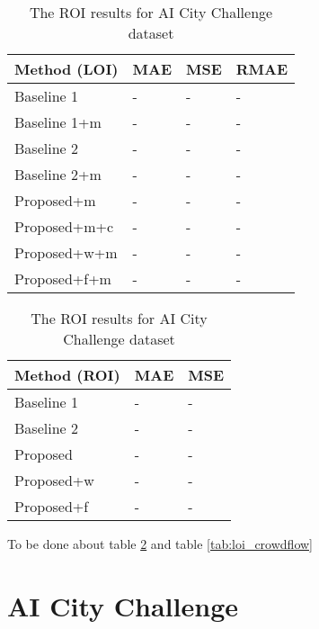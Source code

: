 \begin{table}[!htb]
	\begin{minipage}{.5\linewidth}
      \centering
		\begin{tabular}{llll}
		\hline
		Method (LOI)                               & MAE & MSE & RMAE \\ \hline
		\multicolumn{1}{l|}{Baseline 1}          & - & - & - \\
		\multicolumn{1}{l|}{Baseline 1+m}          & - & - & - \\
		\multicolumn{1}{l|}{Baseline 2}          & - & - & - \\
		\multicolumn{1}{l|}{Baseline 2+m}      & - & - & - \\
		\multicolumn{1}{l|}{Proposed+m}        	 & - & - & - \\
		\multicolumn{1}{l|}{Proposed+m+c}        & - & - & - \\
		\multicolumn{1}{l|}{Proposed+w+m}        & - & - & - \\
		\multicolumn{1}{l|}{Proposed+f+m}        & - & - & - \\ \hline
		\end{tabular}
		\caption{\label{tab:loi_crowdflow}The LOI results for AI City Challenge dataset}
	\end{minipage}
	\begin{minipage}{.5\linewidth}
      \centering
		\begin{tabular}{lll}
		\hline
		Method (ROI)                               & MAE & MSE \\ \hline
		\multicolumn{1}{l|}{Baseline 1}          & - & - \\
		\multicolumn{1}{l|}{Baseline 2}          & - & - \\
		\multicolumn{1}{l|}{Proposed}        	 & - & - \\
		\multicolumn{1}{l|}{Proposed+w} 		 & - & - \\
		\multicolumn{1}{l|}{Proposed+f} & - & - \\ \hline
		\end{tabular}
		\caption{\label{tab:roi_crowdflow}The ROI results for AI City Challenge dataset}
	\end{minipage}
\end{table}

To be done about table \ref{tab:roi_crowdflow} and table \ref{tab:loi_crowdflow}

\section{AI City Challenge}

